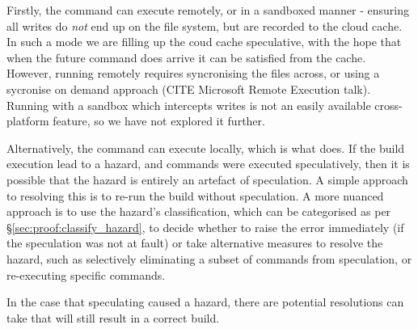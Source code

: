 Firstly, the command can execute remotely, or in a sandboxed manner - ensuring all writes do \emph{not} end up on the file system, but are recorded to the cloud cache. In such a mode we are filling up the coud cache speculative, with the hope that when the future command does arrive it can be satisfied from the cache. However, running remotely requires syncronising the files across, or using a sycronise on demand approach (CITE Microsoft Remote Execution talk). Running with a sandbox which intercepts writes is not an easily available cross-platform feature, so we have not explored it further.

Alternatively, the command can execute locally, which is what \Rattle does. If the build execution lead to a hazard, and commands were executed speculatively, then it is possible that the hazard is entirely an artefact of speculation.  A simple approach to resolving this is to re-run the build without speculation.  A more nuanced approach is to use the hazard's classification, which can be categorised as per \S\ref{sec:proof:classify_hazard}, to decide whether to raise the error immediately (if the speculation was not at fault) or take alternative measures to resolve the hazard, such as selectively eliminating a subset of commands from speculation, or re-executing specific commands.

In the case that speculating caused a hazard, there are potential resolutions \Rattle can take that will still result in a correct build.

